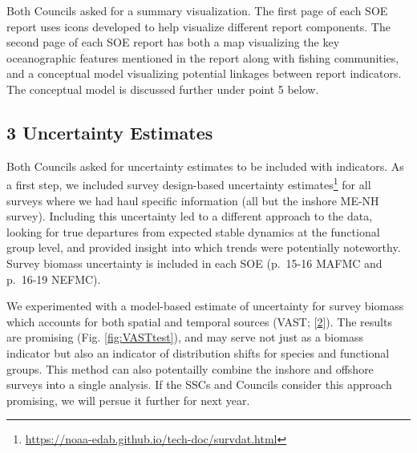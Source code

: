 \documentclass[
  10pt,
]{article}
\begin{document}
Both Councils asked for a summary visualization. The first page of each
SOE report uses icons developed to help visualize different report
components. The second page of each SOE report has both a map
visualizing the key oceanographic features mentioned in the report along
with fishing communities, and a conceptual model visualizing potential
linkages between report indicators. The conceptual model is discussed
further under point 5 below.

\hypertarget{uncertainty-estimates}{%
\subsection{3 Uncertainty Estimates}\label{uncertainty-estimates}}

Both Councils asked for uncertainty estimates to be included with
indicators. As a first step, we included survey design-based uncertainty
estimates\footnote{\url{https://noaa-edab.github.io/tech-doc/survdat.html}}
for all surveys where we had haul specific information (all but the
inshore ME-NH survey). Including this uncertainty led to a different
approach to the data, looking for true departures from expected stable
dynamics at the functional group level, and provided insight into which
trends were potentially noteworthy. Survey biomass uncertainty is
included in each SOE (p.~15-16 MAFMC and p.~16-19 NEFMC).

We experimented with a model-based estimate of uncertainty for survey
biomass which accounts for both spatial and temporal sources (VAST;
{[}\protect\hyperlink{ref-thorson_guidance_2019}{2}{]}). The results are
promising (Fig. \ref{fig:VASTtest}), and may serve not just as a biomass
indicator but also an indicator of distribution shifts for species and
functional groups. This method can also potentailly combine the inshore
and offshore surveys into a single analysis. If the SSCs and Councils
consider this approach promising, we will persue it further for next
year.
\end{document}

